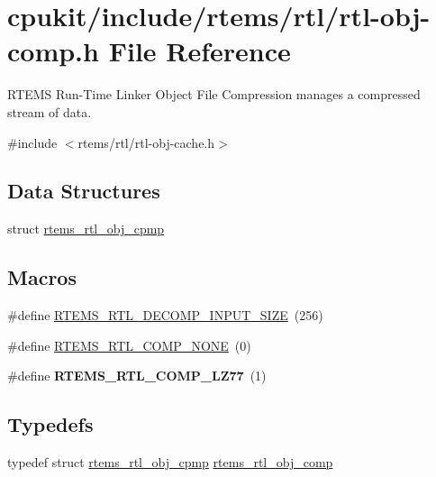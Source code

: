 \hypertarget{rtl-obj-comp_8h}{}\section{cpukit/include/rtems/rtl/rtl-\/obj-\/comp.h File Reference}
\label{rtl-obj-comp_8h}


R\+T\+E\+MS Run-\/\+Time Linker Object File Compression manages a compressed stream of data.  


{\ttfamily \#include $<$rtems/rtl/rtl-\/obj-\/cache.\+h$>$}\newline
\subsection*{Data Structures}
\begin{DoxyCompactItemize}
\item 
struct \mbox{\hyperlink{structrtems__rtl__obj__cpmp}{rtems\+\_\+rtl\+\_\+obj\+\_\+cpmp}}
\end{DoxyCompactItemize}
\subsection*{Macros}
\begin{DoxyCompactItemize}
\item 
\#define \mbox{\hyperlink{rtl-obj-comp_8h_aa83e636f2ed02dc146727d5cdf276344}{R\+T\+E\+M\+S\+\_\+\+R\+T\+L\+\_\+\+D\+E\+C\+O\+M\+P\+\_\+\+I\+N\+P\+U\+T\+\_\+\+S\+I\+ZE}}~(256)
\item 
\#define \mbox{\hyperlink{rtl-obj-comp_8h_a295f45fc293c0e2ee6d9d828451d34eb}{R\+T\+E\+M\+S\+\_\+\+R\+T\+L\+\_\+\+C\+O\+M\+P\+\_\+\+N\+O\+NE}}~(0)
\item 
\mbox{\label{rtl-obj-comp_8h_aef7a8b1c9943d7a0c6fcb0b8df86ca22}} 
\#define {\bfseries R\+T\+E\+M\+S\+\_\+\+R\+T\+L\+\_\+\+C\+O\+M\+P\+\_\+\+L\+Z77}~(1)
\end{DoxyCompactItemize}
\subsection*{Typedefs}
\begin{DoxyCompactItemize}
\item 
typedef struct \mbox{\hyperlink{structrtems__rtl__obj__cpmp}{rtems\+\_\+rtl\+\_\+obj\+\_\+cpmp}} \mbox{\hyperlink{rtl-obj-comp_8h_a5ac76d7cdc14a520157bd5c8a322f56c}{rtems\+\_\+rtl\+\_\+obj\+\_\+comp}}
\end{DoxyCompactItemize}
